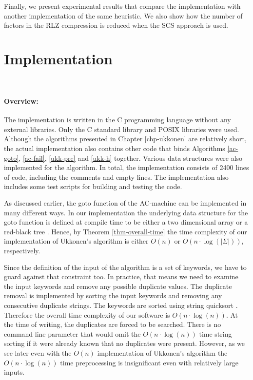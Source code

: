 \documentclass[english,twoside,censored,csm,algorithms-track-2020]{HYthesisML}
\theoremstyle{plain}
\theoremstyle{definition}
\begin{document}
Finally, we present experimental results that compare the implementation with
another implementation of the same heuristic. We also show how the number of factors in the
RLZ compression is reduced when the SCS approach is used.

\section{Implementation}~\label{sec-our}
\paragraph{Overview:}
The implementation is written in the C programming language without any external
libraries. Only the C standard library and POSIX libraries were used.
Although the algorithms presented in Chapter
\ref{chp-ukkonen} are relatively short, the actual implementation also contains other code
that binds Algorithms \ref{ac-goto}, \ref{ac-fail}, \ref{ukk-pre} and \ref{ukk-h} together. 
Various data structures were also implemented for the algorithm. In total, the implementation consists
of 2400 lines of code, including the comments and empty lines. The implementation also includes some
test scripts for building and testing the code. 

As discussed earlier, the goto function of the AC-machine can be implemented in many different
ways. In our implementation the underlying data structure for the goto function is defined at compile
time to be either a two dimensional array or a red-black tree \citep{Cormen09}. Hence, by Theorem \ref{thm-overall-time}
the time complexity of our implementation of Ukkonen's algorithm is either $O(n)$ or
$O(n\cdot\log(|\Sigma|))$, respectively.

Since the definition of the input of the algorithm is a set of keywords, we have to guard against that
constraint too. In practice, that means we need to examine the input keywords and remove any possible
duplicate values. The duplicate removal is implemented by sorting the input keywords and removing any
consecutive duplicate strings. The keywords are sorted using string quicksort \citep{Bentley97}.
Therefore the overall time complexity of our software is $O(n\cdot\log(n))$. At the time of writing, the
duplicates are forced to be searched. There is no command line parameter that would omit the 
$O(n\cdot\log(n))$ time string sorting if it were already known that no duplicates were present.
However, as we see later even with the $O(n)$ implementation
of Ukkonen's algorithm the $O(n\cdot\log(n))$ time preprocessing is insignificant even with relatively
large inputs.
\end{document}
